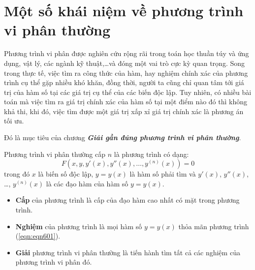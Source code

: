 \section{Một số khái niệm về phương trình vi phân thường}
Phương trình vi phân được nghiên cứu rộng rãi trong toán học thuần túy và ứng dụng, vật lý, các ngành kỹ thuật,\ldots và đóng một vai trò cực kỳ quan trọng. Song trong thực tế, việc tìm ra công thức của hàm, hay nghiệm chính xác của phương trình cụ thể gặp nhiều khó khăn, đồng thời, người ta cũng chỉ quan tâm tới giá trị của hàm số tại các giá trị cụ thể của các biến độc lập. Tuy nhiên, có nhiều bài toán mà việc tìm ra giá trị chính xác của hàm số tại một điểm nào đó thì không khả thi, khi đó, việc tìm được một giá trị xấp xỉ giá trị chính xác là phương án tối ưu.\par
Đó là mục tiêu của chương \textit{\textbf{Giải gần đúng phương trình vi phân thường}}.\par

\begin{definition}
	Phương trình vi phân thường cấp $n$ là phương trình có dạng:
	\begin{equation}\label{eqn:eqn601}
		F\left(x,y,y'(x), y''(x),\ldots, y^{(n)}(x) \right) = 0
	\end{equation}
	trong đó $x$ là biến số độc lập, $y=y(x)$ là hàm số phải tìm và $y'(x)$, $y''(x)$, \ldots, $y^{(n)}(x)$ là các đạo hàm của hàm số $y=y(x)$.
	\begin{itemize}
		\item \textbf{Cấp} của phương trình là cấp của đạo hàm cao nhất có mặt trong phương trình.
		\item \textbf{Nghiệm} của phương trình là mọi hàm số $y=y(x)$ thỏa mãn phương trình (\ref{eqn:eqn601}).
		\item \textbf{Giải} phương trình vi phân thường là tiến hành tìm tất cả các nghiệm của phương trình vi phân đó.
	\end{itemize}
\end{definition}

